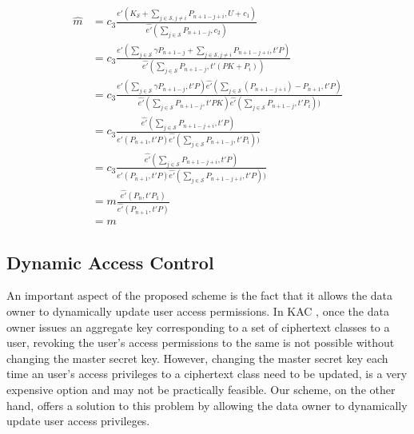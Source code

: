 \begin{scriptsize}
\begin{equation*}
\label{eq:correctness}
\begin{split}
 \hat{m} &= c_3\frac{\hat{e'}(K_{\mathcal{S}}+\sum_{j\in\mathcal{S},j\neq i}P_{n+1-j+i},U+c_1)}{\hat{e'}(\sum_{j\in\mathcal{S}}P_{n+1-j},c_2)}\\
  &= c_3\frac{\hat{e'}(\sum_{j\in \mathcal{S}}{\gamma}P_{n+1-j} + \sum_{j\in\mathcal{S},j\neq i}P_{n+1-j+i},t'P)}{\hat{e'}(\sum_{j\in\mathcal{S}}P_{n+1-j},t'(PK+P_i))}\\
  &= c_3\frac{\hat{e'}(\sum_{j\in \mathcal{S}}{\gamma}P_{n+1-j},t'P)\hat{e'}(\sum_{j\in\mathcal{S}}(P_{n+1-j+i})-P_{n+1},t'P)}{\hat{e'}(\sum_{j\in\mathcal{S}}P_{n+1-j},t'PK)\hat{e'}(\sum_{j\in\mathcal{S}}P_{n+1-j},t'P_i))}\\
  &= c_3\frac{\hat{e'}(\sum_{j\in\mathcal{S}}P_{n+1-j+i},t'P)}{\hat{e'}(P_{n+1},t'P)\hat{e'}(\sum_{j\in\mathcal{S}}P_{n+1-j},t'P_i))}\\
  &= c_3\frac{\hat{e'}(\sum_{j\in\mathcal{S}}P_{n+1-j+i},t'P)}{\hat{e'}(P_{n+1},t'P)\hat{e'}(\sum_{j\in\mathcal{S}}P_{n+1-j+i},t'P))}\\
  &= m\frac{\hat{e'}(P_n,t'P_1)}{\hat{e'}(P_{n+1},t'P)}\\
  &= m
\end{split}  
\end{equation*}
\end{scriptsize}

\subsection{Dynamic Access Control}
\label{subsec:dynamic}

An important aspect of the proposed scheme is the fact that it allows the data owner to dynamically update user access permissions. In KAC \cite{chu2014key}, once the data owner issues an aggregate key corresponding to a set of ciphertext classes to a user, revoking the user's access permissions to the same is not possible without changing the master secret key. However, changing the master secret key each time an user's access privileges to a ciphertext class need to be updated, is a very expensive option and may not be practically feasible. Our scheme, on the other hand, offers a solution to this problem by allowing the data owner to dynamically update user access privileges.

